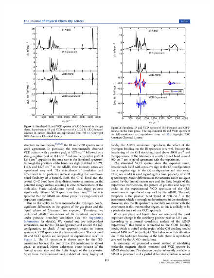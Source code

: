 \documentclass[t]{beamer}
\begin{document}
\begin{frame}
\begin{columns}
\begin{figure}
			\includegraphics[width=.95\textwidth]{figures/butanol_bulk_vcd.pdf}
		\end{figure}
	\end{columns}
\end{frame}
\end{document}
